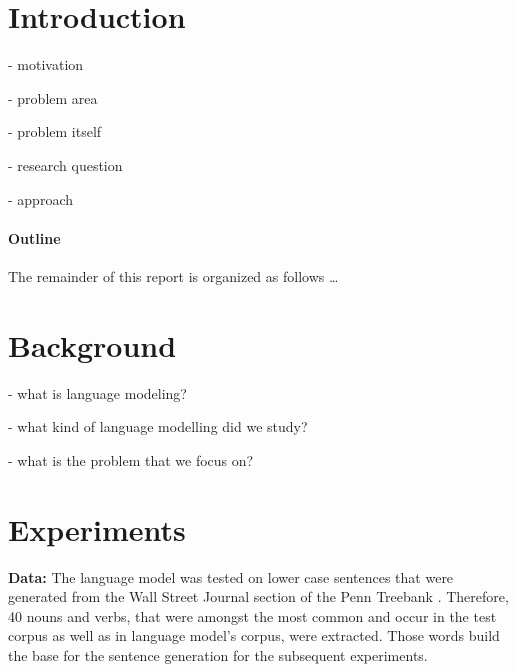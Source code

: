 \documentclass[twoside]{article}
\begin{document}
\begin{multicols}{2} %

\section{Introduction}
- motivation

- problem area

- problem itself

- research question

- approach

\paragraph{Outline}
The remainder of this report is organized as follows \ldots



\section{Background}
\label{background}

- what is language modeling?

- what kind of language modelling did we study?

- what is the problem that we focus on?









\section{Experiments}
\label{experiments}

\textbf{Data:} 
The language model was tested on lower case sentences that were generated from the Wall Street Journal section of the Penn Treebank \citep{Marcus1993}. Therefore, 40 nouns and verbs, that were amongst the most common and occur in the test corpus as well as in language model's corpus, were extracted. Those words build the base for the sentence generation for the subsequent experiments. 


\end{multicols}
\end{document}
